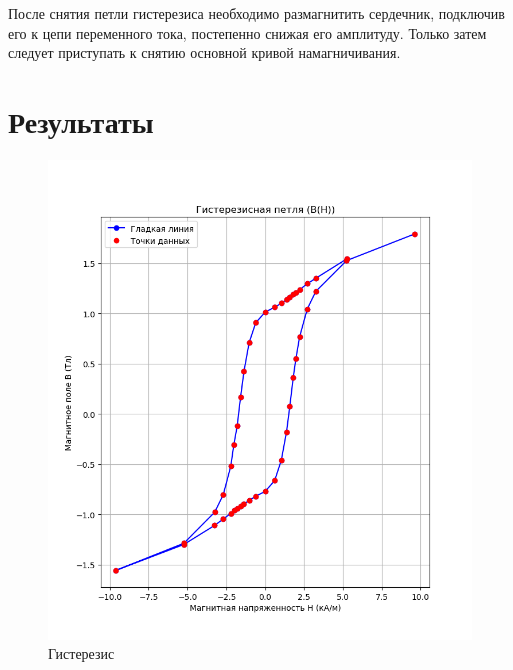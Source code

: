 \documentclass[a4paper, 12pt]{article}
\begin{document}
После снятия петли гистерезиса необходимо размагнитить сердечник, подключив его к цепи переменного тока, постепенно снижая его амплитуду. Только затем следует приступать к снятию основной кривой намагничивания.

\section*{Результаты}

\begin{figure}[ht]
    \centering
    \begin{minipage}[b]{0.45\linewidth}
        \centering
        \includegraphics[width=1.1\linewidth]{fig1_no_errors.png}
        \caption{Гистерезис}
        \label{fig:graph1}
    \end{minipage}
    \hfill
    \begin{minipage}[b]{0.45\linewidth}
        \centering

\end{minipage}
\end{figure}
\end{document}

